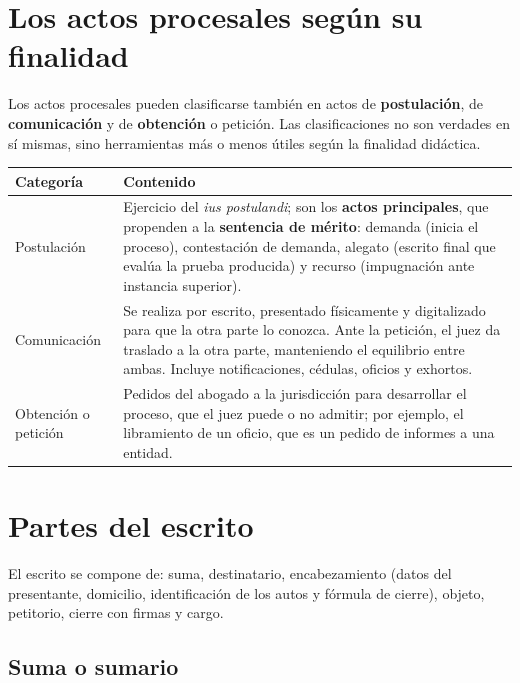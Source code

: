 \documentclass[12pt,oneside]{book}
\renewcommand{\arraystretch}{1.15}
\begin{document}
\section{Los actos procesales según su finalidad}

Los actos procesales pueden clasificarse también en actos de \textbf{postulación}, de \textbf{comunicación} y de \textbf{obtención} o petición. Las clasificaciones no son verdades en sí mismas, sino herramientas más o menos útiles según la finalidad didáctica.

\begin{table}[H]
\centering
\renewcommand{\arraystretch}{1.25}
\begin{tabularx}{\textwidth}{>{\RaggedRight\arraybackslash}p{}>{\RaggedRight\arraybackslash}X}
\toprule
\textbf{Categoría} & \textbf{Contenido} \\
\midrule
Postulación & Ejercicio del \textit{ius postulandi}; son los \textbf{actos principales}, que propenden a la \textbf{sentencia de mérito}: demanda (inicia el proceso), contestación de demanda, alegato (escrito final que evalúa la prueba producida) y recurso (impugnación ante instancia superior). \\
\addlinespace
Comunicación & Se realiza por escrito, presentado físicamente y digitalizado para que la otra parte lo conozca. Ante la petición, el juez da traslado a la otra parte, manteniendo el equilibrio entre ambas. Incluye notificaciones, cédulas, oficios y exhortos. \\
\addlinespace
Obtención o petición & Pedidos del abogado a la jurisdicción para desarrollar el proceso, que el juez puede o no admitir; por ejemplo, el libramiento de un oficio, que es un pedido de informes a una entidad. \\
\bottomrule
\end{tabularx}
\end{table}

\section{Partes del escrito}

El escrito se compone de: suma, destinatario, encabezamiento (datos del presentante, domicilio, identificación de los autos y fórmula de cierre), objeto, petitorio, cierre con firmas y cargo.

\subsection{Suma o sumario}
\end{document}
